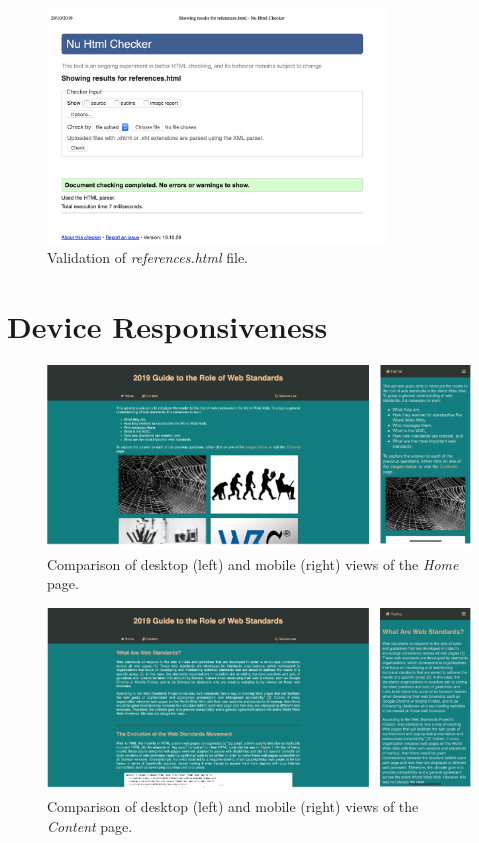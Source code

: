 \documentclass[letterpaper,12pt]{article}
\begin{document}
\begin{appendices}
\begin{figure}[h] 
\centerline{\includegraphics[width=0.8\textwidth]{report/images/validation-references.png}}
\caption{\label{fig:validation-references.png}Validation of \textit{references.html} file.}
\end{figure}

\clearpage
\section{Device Responsiveness}
\label{sec:appendix-device-responsiveness}

\begin{figure}[h] 
\centerline{\includegraphics[width=\textwidth]{report/images/comparison-index.png}}
\caption{\label{fig:comparison-index}Comparison of desktop (left) and mobile (right) views of the \textit{Home} page.}
\end{figure}

\begin{figure}[h] 
\centerline{\includegraphics[width=\textwidth]{report/images/comparison-content-top.png}}
\caption{\label{fig:comparison-content-top}Comparison of desktop (left) and mobile (right) views of the \textit{Content} page.}
\end{figure}


\end{appendices}
\end{document}
